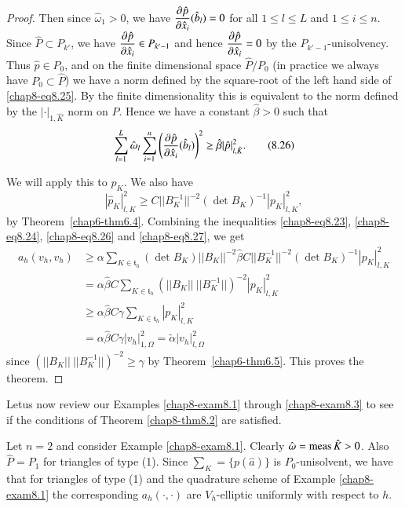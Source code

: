 \begin{proof}
Then since $\hat{\omega}_{1}>0$, we have $\dfrac{\partial \hat{p}}{\partial
  \hat{x}_{i}}(\hat{b}_{l})=0$ for all $1\leq l\leq L$ and $1\leq
i\leq n$. Since $\hat{P}\subset P_{k'}$, we have $\dfrac{\partial
  \hat{p}}{\partial \hat{x}_{i}}\in P_{k'-1}$ and hence $\dfrac{\partial
  \hat{p}}{\partial \hat{x}_{i}}=0$ by the $P_{k'-1}$-unisolvency. Thus
$\hat{p}\in P_{0}$, and on the finite dimensional space
$\hat{P}/P_{0}$ (in practice we always have $P_{0}\subset \hat{P}$) we
have a norm defined by the square-root of the left hand side of
\eqref{chap8-eq8.25}. By the finite dimensionality this is equivalent
to the norm defined by the $|\cdot|_{1,\hat{K}}$ norm on $P$. Hence we
have a constant $\hat{\beta}>0$ such that
\begin{equation*}
\sum^{L}_{l=1}\hat{\omega}_{l}\sum^{n}_{i=1}\left(\frac{\partial \hat{p}}{\partial
  \hat{x}_{i}}(\hat{b}_{l})\right)^{2}\geq
\hat{\beta}|\hat{p}|^{2}_{l,\hat{K}}.\tag{8.26}\label{chap8-eq8.26} 
\end{equation*}

We will apply this to $\hat{p}_{K}$. We also have
\begin{equation*}
|\hat{p}_{K}|^{2}_{l,K}\geq C||B^{-1}_{K}||^{-2}(\det
B_{K})^{-1}|p_{K}|^{2}_{l,K},\tag{8.27} \label{chap8-eq8.27}
\end{equation*}
by Theorem~\ref{chap6-thm6.4}. Combining the inequalities
\eqref{chap8-eq8.23}, \eqref{chap8-eq8.24}, \eqref{chap8-eq8.26} and
\eqref{chap8-eq8.27}, we get
\begin{align*}
a_{h}(v_{h},v_{h}) &\geq \alpha\sum_{K\in\mathfrak{t}_{h}}(\det
B_{K})||B_{K}||^{-2}\hat{\beta}C||B^{-1}_{K}||^{-2}(\det
B_{K})^{-1}|p_{K}|^{2}_{l,K}\\
&=\alpha\hat{\beta}C
\sum_{K\in\mathfrak{t}_{h}}(||B_{K}||~||B^{-1}_{K}||)^{-2}|p_{K}|^{2}_{l,K}\\
&\geq
\alpha\hat{\beta}C \gamma\sum_{K\in\mathfrak{t}_{h}}|p_{K}|^{2}_{l,K}\\
&=\alpha\hat{\beta}C\gamma|v_{h}|^{2}_{1,\Omega}=\tilde{\alpha}|v_{h}|^{2}_{l,\Omega} 
\end{align*}
since $(||B_{K}||~||B^{-1}_{K}||)^{-2}\geq\gamma$ by
Theorem~\ref{chap6-thm6.5}. This proves the theorem.
\end{proof}

Let\pageoriginale us now review our Examples \ref{chap8-exam8.1}
through \ref{chap8-exam8.3} to see if the conditions of Theorem
\ref{chap8-thm8.2} are satisfied.

Let $n=2$ and consider Example \ref{chap8-exam8.1}. Clearly
$\hat{\omega}=\operatorname{meas} \hat{K}>0$. Also $\hat{P}=P_{1}$ for triangles of
type (1). Since $\sum_{K}=\{p(\hat{a})\}$ is $P_{0}$-unisolvent, we
have that for triangles of type (1) and the quadrature scheme of
Example \ref{chap8-exam8.1} the corresponding $a_{h}(\cdot,\cdot)$ are
$V_{h}$-elliptic uniformly with respect to $h$.

